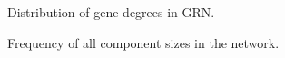\documentclass[pdftex,12pt,a4paper]{report}
\begin{document}
\begin{figure}[!ht]
\begin{center}
	\caption{Distribution of gene degrees in GRN.}
	\label{gene_degree}
\end{center}
\end{figure}

\begin{figure}[!ht]
\begin{center}
	\caption{Frequency of all component sizes in the network.}
	\label{comp_freq}
\end{center}
\end{figure}
\end{document}

